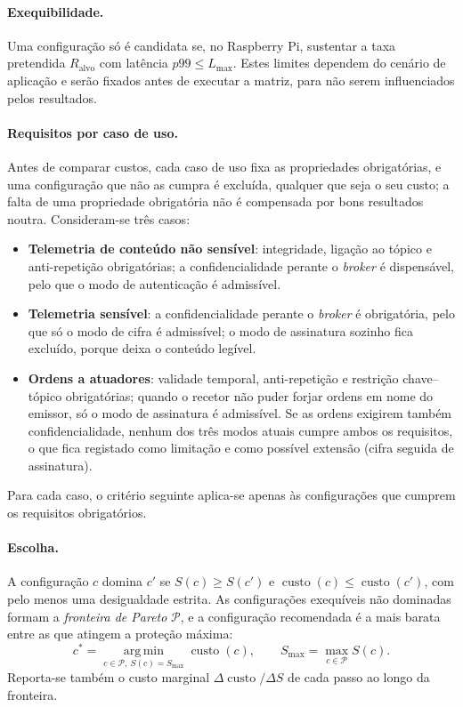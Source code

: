 \paragraph{Exequibilidade.} Uma configuração só é candidata se, no Raspberry Pi,
sustentar a taxa pretendida $R_{\text{alvo}}$ com latência $p99 \le L_{\max}$. Estes
limites dependem do cenário de aplicação e serão fixados antes de executar a
matriz, para não serem influenciados pelos resultados.

\paragraph{Requisitos por caso de uso.} Antes de comparar custos, cada caso de uso
fixa as propriedades obrigatórias, e uma configuração que não as cumpra é excluída,
qualquer que seja o seu custo; a falta de uma propriedade obrigatória não é
compensada por bons resultados noutra. Consideram-se três casos:
\begin{itemize}[leftmargin=*]
  \item \textbf{Telemetria de conteúdo não sensível}: integridade, ligação ao tópico
    e anti-repetição obrigatórias; a confidencialidade perante o \emph{broker} é
    dispensável, pelo que o modo de autenticação é admissível.
  \item \textbf{Telemetria sensível}: a confidencialidade perante o \emph{broker} é
    obrigatória, pelo que só o modo de cifra é admissível; o modo de assinatura
    sozinho fica excluído, porque deixa o conteúdo legível.
  \item \textbf{Ordens a atuadores}: validade temporal, anti-repetição e restrição
    chave--tópico obrigatórias; quando o recetor não puder forjar ordens em nome do
    emissor, só o modo de assinatura é admissível. Se as ordens exigirem também
    confidencialidade, nenhum dos três modos atuais cumpre ambos os requisitos,
    o que fica registado como limitação e como possível extensão (cifra seguida de
    assinatura).
\end{itemize}
Para cada caso, o critério seguinte aplica-se apenas às configurações que cumprem
os requisitos obrigatórios.

\paragraph{Escolha.} A configuração $c$ domina $c'$ se $S(c) \ge S(c')$ e
$\operatorname{custo}(c) \le \operatorname{custo}(c')$, com pelo menos uma desigualdade estrita. As configurações
exequíveis não dominadas formam a \emph{fronteira de Pareto} $\mathcal{P}$, e a
configuração recomendada é a mais barata entre as que atingem a proteção máxima:
\begin{equation}
  c^{*} = \operatorname*{arg\,min}_{c \in \mathcal{P},\ S(c) = S_{\max}} \operatorname{custo}(c),
  \qquad S_{\max} = \max_{c \in \mathcal{P}} S(c).
  \label{eq:melhor}
\end{equation}
Reporta-se também o custo marginal $\Delta \operatorname{custo} / \Delta S$ de cada passo ao longo da
fronteira.

